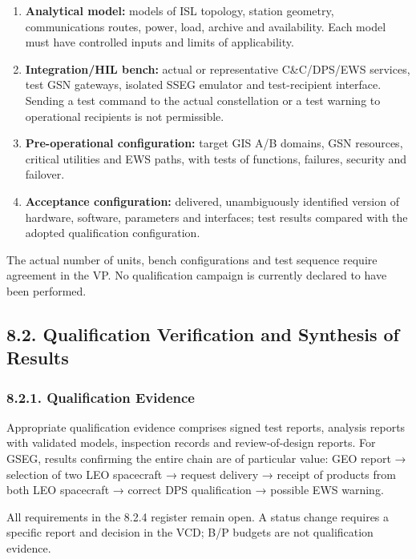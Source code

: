 \begin{enumerate}
\item \textbf{Analytical model:} models of ISL topology, station geometry, communications routes, power, load, archive and availability. Each model must have controlled inputs and limits of applicability.
\item \textbf{Integration/\allowbreak{}HIL bench:} actual or representative C\&C/\allowbreak{}DPS/\allowbreak{}EWS services, test GSN gateways, isolated SSEG emulator and test-recipient interface. Sending a test command to the actual constellation or a test warning to operational recipients is not permissible.
\item \textbf{Pre-operational configuration:} target GIS A/\allowbreak{}B domains, GSN resources, critical utilities and EWS paths, with tests of functions, failures, security and failover.
\item \textbf{Acceptance configuration:} delivered, unambiguously identified version of hardware, software, parameters and interfaces; test results compared with the adopted qualification configuration.
\end{enumerate}

The actual number of units, bench configurations and test sequence require agreement in the VP. No qualification campaign is currently declared to have been performed.

\subsection{8.2. Qualification Verification and Synthesis of Results}\label{ddjf-8-2}

\subsubsection{8.2.1. Qualification Evidence}\label{ddjf-8-2-1}

Appropriate qualification evidence comprises signed test reports, analysis reports with validated models, inspection records and review-of-design reports. For GSEG, results confirming the entire chain are of particular value: GEO report → selection of two LEO spacecraft → request delivery → receipt of products from both LEO spacecraft → correct DPS qualification → possible EWS warning.

All requirements in the 8.2.4 register remain open. A status change requires a specific report and decision in the VCD; B/\allowbreak{}P budgets are not qualification evidence.

